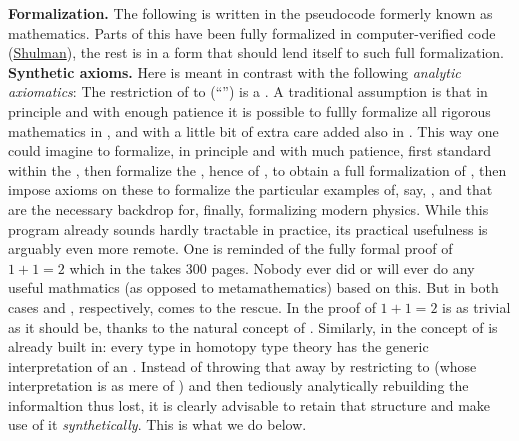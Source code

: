 \documentclass[12pt,titlepage]{article}
\theoremstyle{plain}
\theoremstyle{definition}
\theoremstyle{remark}
\begin{document}
 
\textbf{Formalization.} The following is written in the pseudocode formerly known as mathematics. Parts of this have been fully formalized in computer-verified code (\hyperlink{Shulman}{Shulman}), the rest is in a form that should lend itself to such full formalization.
\textbf{Synthetic axioms.} Here  is meant in contrast with the following \emph{analytic axiomatics}: The restriction of  to  (``'') is a . A traditional assumption is that in principle and with enough patience it is possible to fullly formalize all rigorous mathematics in , and with a little bit of extra care added also in . This way one could imagine to formalize, in principle and with much patience, first standard  within the , then formalize the , hence of , to obtain a full formalization of , then impose axioms on these to formalize the particular examples of, say, ,  and  that are the necessary backdrop for, finally, formalizing modern physics.
While this program already sounds hardly tractable in practice, its practical usefulness is arguably even more remote. One is reminded of the fully formal proof of $1+1 = 2$ which in the  takes 300 pages. Nobody ever did or will ever do any useful mathmatics (as opposed to metamathematics) based on this.
But in both cases  and , respectively, comes to the rescue. In  the proof of $1+1 = 2$ is as trivial as it should be, thanks to the natural concept of . Similarly, in  the concept of  is already built in: every type in homotopy type theory has the generic interpretation of an . Instead of throwing that away by restricting to  (whose interpretation is as mere  of ) and then tediously analytically rebuilding the informaltion thus lost, it is clearly advisable to retain that structure and make use of it \emph{synthetically}. This is what we do below.
\end{document}
